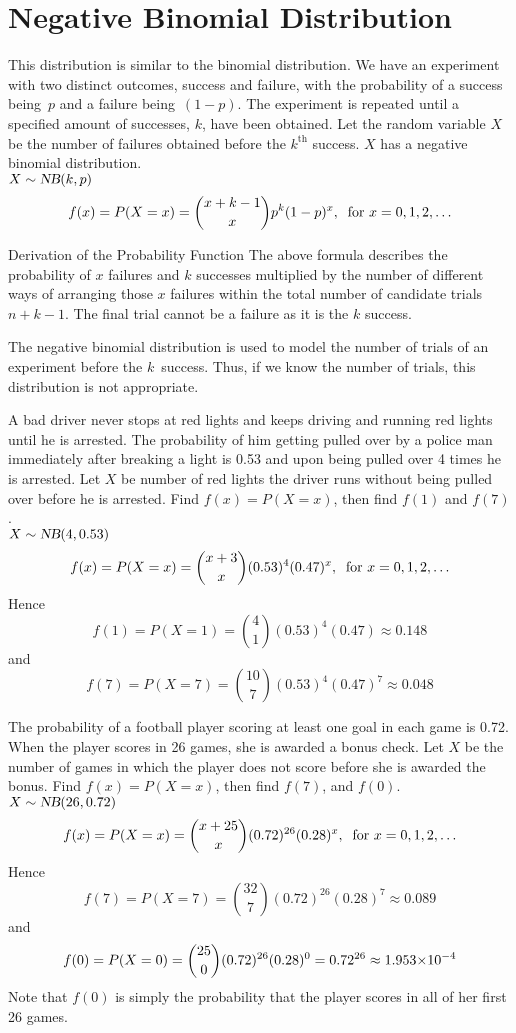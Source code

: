 \section{Negative Binomial Distribution}
This distribution is similar to the binomial distribution. We have an experiment with two distinct outcomes, success and failure, with the probability of a success being~$p$ and a failure being~$(1-p)$. The experiment is repeated until a specified amount of successes, $k$, have been obtained. Let the random variable $X$ be the number of failures obtained before the $k^\text{th}$ success. $X$ has a negative binomial distribution. \\
$X\sim\operatorname{\textsl{NB}}(k,p)$
\[
    f(x) = P(X = x) = \binom{x+k-1}{x} p^k (1-p)^x,\:\text{ for } x = 0,1,2,\ldots
\]
\begin{theory}{Derivation of the Probability Function}
The above formula describes the probability of $x$ failures and $k$ successes multiplied by the number of different ways of arranging those $x$ failures within the total number of candidate trials $n+k-1$. The final trial cannot be a failure as it is the $k$ success.
\end{theory}
\begin{info}
The negative binomial distribution is used to model the number of trials of an experiment before the $k$~success. Thus, if we know the number of trials, this distribution is not appropriate.
\end{info}
\begin{example}
A bad driver never stops at red lights and keeps driving and running red lights until he is arrested. The probability of him getting pulled over by a police man immediately after breaking a light is 0.53 and upon being pulled over 4 times he is arrested. Let $X$ be number of red lights the driver runs without being pulled over before he is arrested. Find $f(x)=P(X=x)$, then find $f(1)$ and $f(7)$. \\
$X\sim\operatorname{\textsl{NB}}(4,0.53)$ 
\[
    f(x) = P(X = x) = \binom{x+3}{x} (0.53)^4 (0.47)^x,\:\text{ for } x = 0,1,2,\ldots
\]
Hence 
\[
    f(1) = P(X = 1) = \binom{4}{1} (0.53)^4 (0.47) \approx 0.148
\]
and
\[
    f(7) = P(X = 7) = \binom{10}{7} (0.53)^4 (0.47)^7 \approx 0.048
\]
\end{example}
\begin{example}
The probability of a football player scoring at least one goal in each game is 0.72. When the player scores in 26 games, she is awarded a bonus check. Let $X$ be the number of games in which the player does not score before she is awarded the bonus. Find $f(x)=P(X=x)$, then find $f(7)$, and $f(0)$. \\
$X\sim\operatorname{\textsl{NB}}(26,0.72)$ 
\[
    f(x) = P(X = x) = \binom{x+25}{x} (0.72)^{26} (0.28)^x,\:\text{ for } x=0,1,2,\ldots
\]
Hence 
\[
    f(7) = P(X = 7) = \binom{32}{7} (0.72)^{26} (0.28)^7 \approx 0.089
\]
and 
\[
    f(0) = P(X = 0) = \binom{25}{0} (0.72)^{26} (0.28)^0 = 0.72^{26} \approx {1.953}{\times}10^{-4}
\]
Note that $f(0)$ is simply the probability that the player scores in all of her first 26 games.
\end{example}
